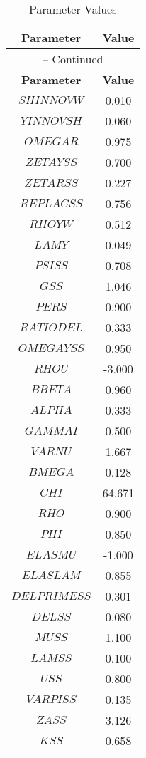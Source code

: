 \begin{center}
\begin{longtable}{cc}
\caption{Parameter Values}\\%
\toprule%
\multicolumn{1}{c}{\textbf{Parameter}} &
\multicolumn{1}{c}{\textbf{Value}}  \\%
\midrule%
\endfirsthead
\multicolumn{2}{c}{{\tablename} \thetable{} -- Continued}\\%
\midrule%
\multicolumn{1}{c}{\textbf{Parameter}} &
\multicolumn{1}{c}{\textbf{Value}} \\%
\midrule%
\endhead
$SHINNOVW$ 	 & 	 0.010 \\
$YINNOVSH$ 	 & 	 0.060 \\
$OMEGAR$ 	 & 	 0.975 \\
$ZETAYSS$ 	 & 	 0.700 \\
$ZETARSS$ 	 & 	 0.227 \\
$REPLACSS$ 	 & 	 0.756 \\
$RHOYW$ 	 & 	 0.512 \\
$LAMY$ 	 & 	 0.049 \\
$PSISS$ 	 & 	 0.708 \\
$GSS$ 	 & 	 1.046 \\
$PERS$ 	 & 	 0.900 \\
$RATIODEL$ 	 & 	 0.333 \\
$OMEGAYSS$ 	 & 	 0.950 \\
$RHOU$ 	 & 	 -3.000 \\
$BBETA$ 	 & 	 0.960 \\
$ALPHA$ 	 & 	 0.333 \\
$GAMMAI$ 	 & 	 0.500 \\
$VARNU$ 	 & 	 1.667 \\
$BMEGA$ 	 & 	 0.128 \\
$CHI$ 	 & 	 64.671 \\
$RHO$ 	 & 	 0.900 \\
$PHI$ 	 & 	 0.850 \\
$ELASMU$ 	 & 	 -1.000 \\
$ELASLAM$ 	 & 	 0.855 \\
$DELPRIMESS$ 	 & 	 0.301 \\
$DELSS$ 	 & 	 0.080 \\
$MUSS$ 	 & 	 1.100 \\
$LAMSS$ 	 & 	 0.100 \\
$USS$ 	 & 	 0.800 \\
$VARPISS$ 	 & 	 0.135 \\
$ZASS$ 	 & 	 3.126 \\
$KSS$ 	 & 	 0.658 \\

\end{longtable}
\end{center}
